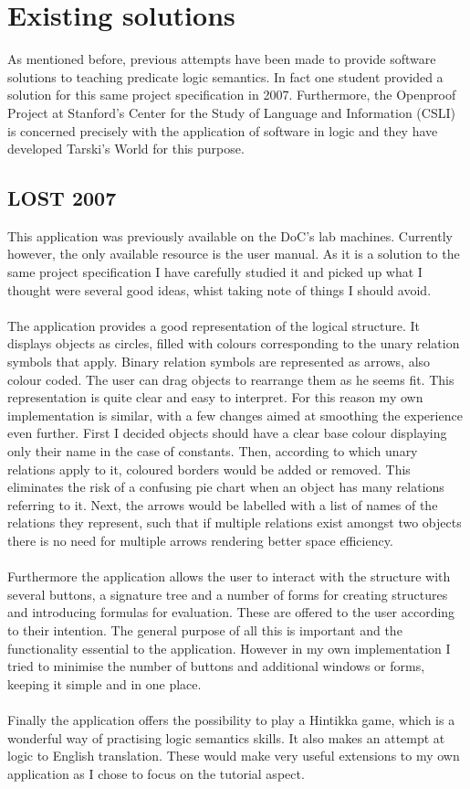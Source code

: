 \documentclass{report}
\begin{document}
\section{Existing solutions}
As mentioned before, previous attempts have been made to provide software solutions to teaching predicate logic semantics. In fact one student provided a solution for this same project specification in 2007. Furthermore, the Openproof Project at Stanford's Center for the Study of Language and Information (CSLI) is concerned precisely with the application of software in logic and they have developed Tarski's World for this purpose.

\subsection{LOST 2007}
This application was previously available on the DoC's lab machines. Currently however, the only available resource is the user manual. As it is a solution to the same project specification I have carefully studied it and picked up what I thought were several good ideas, whist taking note of things I should avoid. \\ \\
The application provides a good representation of the logical structure. It displays objects as circles, filled with colours corresponding to the unary relation symbols that apply. Binary relation symbols are represented as arrows, also colour coded. The user can drag objects to rearrange them as he seems fit. This representation is quite clear and easy to interpret. For this reason my own implementation is similar, with a few changes aimed at smoothing the experience even further. First I decided objects should have a clear base colour displaying only their name in the case of constants. Then, according to which unary relations apply to it, coloured borders would be added or removed. This eliminates the risk of a confusing pie chart when an object has many relations referring to it. Next, the arrows would be labelled with a list of names of the relations they represent, such that if multiple relations exist amongst two objects there is no need for multiple arrows rendering better space efficiency.\\ \\
Furthermore the application allows the user to interact with the structure with several buttons, a signature tree and a number of forms for creating structures and introducing formulas for evaluation. These are offered to the user according to their intention. The general purpose of all this is important and the functionality essential to the application. However in my own implementation I tried to minimise the number of buttons and additional windows or forms, keeping it simple and in one place. \\ \\
Finally the application offers the possibility to play a Hintikka game, which is a wonderful way of practising logic semantics skills. It also makes an attempt at logic to English translation. These would make very useful extensions to my own application as I chose to focus on the tutorial aspect.
\end{document}
